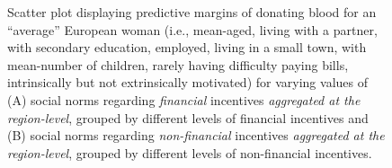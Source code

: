 \documentclass[AER]{AEA}
\begin{document}
\begin{figure}[hbt!]
\begin{subfigure}{.48\textwidth}
\end{subfigure}
\caption{Scatter plot displaying predictive margins of donating blood for an “average” European woman (i.e., mean-aged, living with a partner, with secondary education, employed, living in a small town, with mean-number of children, rarely having difficulty paying bills, intrinsically but not extrinsically motivated) for varying values of (A) social norms regarding \textit{financial} incentives \textit{aggregated at the region-level}, grouped by different levels of financial incentives and (B) social norms regarding \textit{non-financial} incentives \textit{aggregated at the region-level}, grouped by different levels of non-financial incentives.}
\label{fig:scatter_region}
\end{figure}



%
\end{document}
